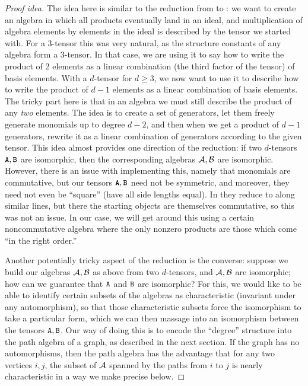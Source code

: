 \documentclass[11pt]{article}
\begin{document}
\begin{proof}[Proof idea]
The idea here is similar to the reduction from \ThreeTI to \AlgIsolong: we want to 
create an algebra in which all products eventually land in an ideal, and 
multiplication of algebra elements by elements in the ideal is described by the 
tensor we started with. For a 3-tensor this was very natural, as the structure 
constants of any algebra form a 3-tensor. In that case, we are using it to say how 
to write the product of 2 elements as a linear combination (the third factor of 
the tensor) of basis elements. With a $d$-tensor for $d \geq 3$, we now want to 
use it to describe how to write the product of $d-1$ elements as a linear 
combination of basis elements. The tricky part here is that in an algebra we must 
still describe the product of any \emph{two} elements. The idea is to create a set 
of generators, let them freely generate monomials up to degree $d-2$, and then 
when we get a product of $d-1$ generators, rewrite it as a linear combination of 
generators according to the given tensor. This idea almost provides one direction 
of the reduction: if two $d$-tensors $\mathtt{A}, \mathtt{B}$ are isomorphic, then the 
corresponding algebras $\mathcal{A},\mathcal{B}$ are isomorphic. 
However, there is an issue with implementing this, namely that monomials are 
commutative, but our tensors $\mathtt{A},\mathtt{B}$ need not be symmetric, and moreover, they 
need not even be ``square'' (have all side lengths equal). 
In \cite[Thm.~5]{AS05} they reduce \DFormlong to  along similar lines, but there the starting objects are themselves 
commutative, so this was not an issue. 
In our case, we will get around this 
using a certain noncommutative algebra where the only nonzero products are those 
which come ``in the right order.''

Another potentially tricky aspect of the reduction is the converse: suppose we build our algebras $\mathcal{A},\mathcal{B}$ as above from two $d$-tensors, and $\mathcal{A},\mathcal{B}$ are isomorphic; how can we guarantee that $\mathtt{A}$ and $\mathtt{B}$ are isomorphic? For this, we would like to be able to identify certain subsets of the algebras as characteristic (invariant under any automorphism), so that those characteristic subsets force the isomorphism to take a particular form, which we can then massage into an isomorphism between the tensors $\mathtt{A}, \mathtt{B}$. Our way of doing this is to encode the ``degree'' structure into the path algebra of a graph, as described in the next section. If the graph has no automorphisms, then the path algebra has the advantage that for any two vertices $i,j$, the subset of $\mathcal{A}$ spanned by the paths from $i$ to $j$ is nearly characteristic in a way we make precise below. 
\end{proof}
\end{document}
